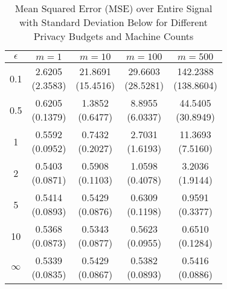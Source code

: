 \begin{table}[ht]
\centering
\begin{tabular}{ccccc}
  \toprule
$\epsilon$ & $m=1$ & $m=10$ & $m=100$ & $m=500$ \\ 
  \midrule
0.1 & \makecell{2.6205 \\ (2.3583)} & \makecell{21.8691 \\ (15.4516)} & \makecell{29.6603 \\ (28.5281)} & \makecell{142.2388 \\ (138.8604)} \\ 
  0.5 & \makecell{0.6205 \\ (0.1379)} & \makecell{1.3852 \\ (0.6477)} & \makecell{8.8955 \\ (6.0337)} & \makecell{44.5405 \\ (30.8949)} \\ 
  1 & \makecell{0.5592 \\ (0.0952)} & \makecell{0.7432 \\ (0.2027)} & \makecell{2.7031 \\ (1.6193)} & \makecell{11.3693 \\ (7.5160)} \\ 
  2 & \makecell{0.5403 \\ (0.0871)} & \makecell{0.5908 \\ (0.1103)} & \makecell{1.0598 \\ (0.4078)} & \makecell{3.2036 \\ (1.9144)} \\ 
  5 & \makecell{0.5414 \\ (0.0893)} & \makecell{0.5429 \\ (0.0876)} & \makecell{0.6309 \\ (0.1198)} & \makecell{0.9591 \\ (0.3377)} \\ 
  10 & \makecell{0.5368 \\ (0.0873)} & \makecell{0.5343 \\ (0.0877)} & \makecell{0.5623 \\ (0.0955)} & \makecell{0.6510 \\ (0.1284)} \\ 
  $\infty$ & \makecell{0.5339 \\ (0.0835)} & \makecell{0.5429 \\ (0.0867)} & \makecell{0.5382 \\ (0.0893)} & \makecell{0.5416 \\ (0.0886)} \\ 
   \bottomrule
\end{tabular}
\caption{Mean Squared Error (MSE) over Entire Signal with Standard Deviation Below for Different Privacy Budgets and Machine Counts} 
\label{tab:mse_total}
\end{table}
